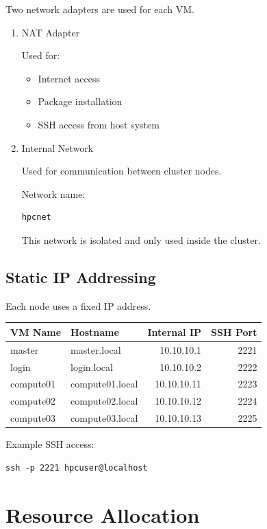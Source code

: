 \documentclass[11pt]{article}
\begin{document}
Two network adapters are used for each VM.
\begin{enumerate}
\item NAT Adapter
\label{sec:org40b9396}

Used for:

\begin{itemize}
\item Internet access
\item Package installation
\item SSH access from host system
\end{itemize}
\item Internal Network
\label{sec:orga770ccf}

Used for communication between cluster nodes.

Network name:

\begin{verbatim}
hpcnet
\end{verbatim}

This network is isolated and only used inside the cluster.
\end{enumerate}
\subsection{Static IP Addressing}
\label{sec:org0342b68}

Each node uses a fixed IP address.

\begin{center}
\begin{tabular}{llrr}
VM Name & Hostname & Internal IP & SSH Port\\
\hline
master & master.local & 10.10.10.1 & 2221\\
login & login.local & 10.10.10.2 & 2222\\
compute01 & compute01.local & 10.10.10.11 & 2223\\
compute02 & compute02.local & 10.10.10.12 & 2224\\
compute03 & compute03.local & 10.10.10.13 & 2225\\
\end{tabular}
\end{center}

Example SSH access:

\begin{verbatim}
ssh -p 2221 hpcuser@localhost
\end{verbatim}
\section{Resource Allocation}
\label{sec:orga8380cf}
\end{document}
